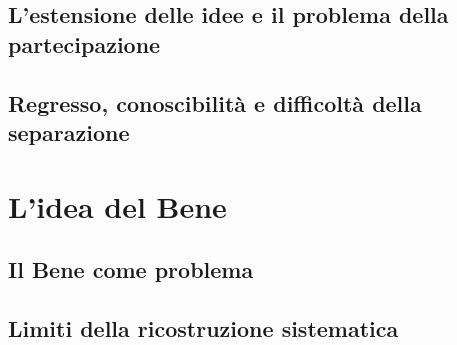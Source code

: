 \subsection{L'estensione delle idee e il problema della partecipazione}

\subsection{Regresso, conoscibilità e difficoltà della separazione}

\section{L'idea del Bene}

\subsection{Il Bene come problema}

\subsection{Limiti della ricostruzione sistematica}
